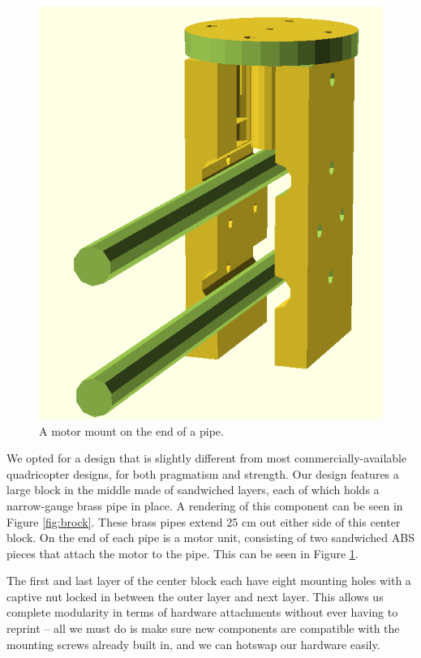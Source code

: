 \documentclass[letterpaper]{article}
\newcommand\figref[1]{Figure \ref{fig:#1}}
\begin{document}
\begin{figure}[htb]
  \centering
  \includegraphics[scale=0.4]{figures/fred}
  \caption{A motor mount on the end of a pipe.}
  \label{fig:fred}
\end{figure}

We opted for a design that is slightly different from most
commercially-available quadricopter designs, for both pragmatism and
strength. Our design features a large block in the middle made
of sandwiched layers, each of which holds a narrow-gauge brass pipe in
place. A rendering of this component can be seen in
\figref{brock}. These brass pipes extend 25 cm out either side of this
center block. On the end of each pipe is a motor unit, consisting of
two sandwiched ABS pieces that attach the motor to the pipe. This can
be seen in \figref{fred}.

The first and last layer of the center block each have eight mounting
holes with a captive nut locked in between the outer layer and next
layer. This allows us complete modularity in terms of hardware
attachments without ever having to reprint -- all we must do is
make sure new components are compatible with the mounting screws already
built in, and we can hotswap our hardware easily.
\end{document}
